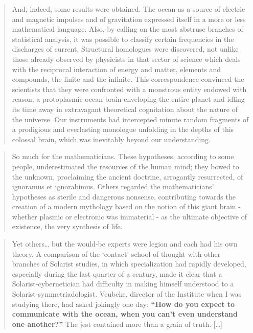 \begin{itemize}
{\begin{quote}
    And, indeed, some results were obtained. The ocean as a source of
    electric and magnetic impulses and of gravitation expressed itself
    in a more or less mathematical language. Also, by calling on the
    most abstruse branches of statistical analysis, it was possible to
    classify certain frequencies in the discharges of current.
    Structural homologues were discovered, not unlike those already
    observed by physicists in that sector of science which deals with
    the reciprocal interaction of energy and matter, elements and
    compounds, the finite and the infinite. This correspondence
    convinced the scientists that they were confronted with a monstrous
    entity endowed with reason, a protoplasmic ocean-brain enveloping
    the entire planet and idling its time away in extravagant
    theoretical cognitation about the nature of the universe. Our
    instruments had intercepted minute random fragments of a prodigious
    and everlasting monologue unfolding in the depths of this colossal
    brain, which was inevitably beyond our understanding.
    \end{quote}

    \begin{quote}
    So much for the mathematicians. These hypotheses, according to some
    people, underestimated the resources of the human mind; they bowed
    to the unknown, proclaiming the ancient doctrine, arrogantly
    resurrected, of ignoramus et ignorabimus. Others regarded the
    mathematicians' hypotheses as sterile and dangerous nonsense,
    contributing towards the creation of a modern mythology based on the
    notion of this giant brain - whether plasmic or electronic was
    immaterial - as the ultimate objective of existence, the very
    synthesis of life.
    \end{quote}

    \begin{quote}
    Yet others\ldots{} but the would-be experts were legion and each had
    his own theory. A comparison of the `contact' school of thought with
    other branches of Solarist studies, in which specialization had
    rapidly developed, especially during the last quarter of a century,
    made it clear that a Solarist-cybernetician had difficulty in making
    himself understood to a Solarist-symmetriadologist. Veubeke,
    director of the Institute when I was studying there, had asked
    jokingly one day: \textbf{``How do you expect to communicate with
    the ocean, when you can't even understand one another?''} The jest
    contained more than a grain of truth. {[}\ldots{]}
    \end{quote}

}
\end{itemize}
